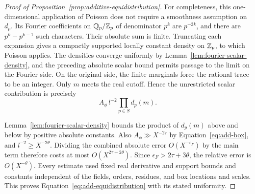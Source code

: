 \begin{proof}[Proof of Proposition~\ref{prop:additive-equidistribution}]
For completeness, this one-dimensional application of Poisson does not
require a smoothness assumption on \(d_p\).  Its Fourier coefficients on
\(\mathbb Q_p/\mathbb Z_p\) of denominator \(p^k\) are \(p^{-3k}\), and there are
\(p^k-p^{k-1}\) such characters.  Their absolute sum is finite.
Truncating each expansion gives a compactly supported locally constant
density on \(\mathbb Z_p\), to which Poisson applies.  The densities converge
uniformly by Lemma~\ref{lem:fourier-scalar-density}, and the preceding
absolute scalar bound permits passage to the limit on the Fourier side.
On the original side, the finite marginals force the rational trace to be
an integer.  Only \(m\) meets the real cutoff.  Hence the unrestricted
scalar contribution is precisely
\[
 A_\phi\,l^{-2}\prod_{p\in S}d_p(m).
\]

Lemma~\ref{lem:fourier-scalar-density} bounds the product of \(d_p(m)\)
above and below by positive absolute constants.  Also
\(A_\phi\gg X^{-2\tau}\) by Equation~\eqref{eq:add-box}, and
\(l^{-2}\ge X^{-2\theta}\).  Dividing the combined absolute error
\(O(X^{-\epsilon_F})\) by the main term therefore costs at most
\(O(X^{2\tau+2\theta})\).  Since
\(\epsilon_F>2\tau+3\theta\), the relative error is \(O(X^{-\theta})\).
Every estimate used fixed real derivative and support bounds and constants
independent of the fields, orders, residues, and box locations and scales.
This proves Equation~\eqref{eq:add-equidistribution} with its stated
uniformity.
\end{proof}
